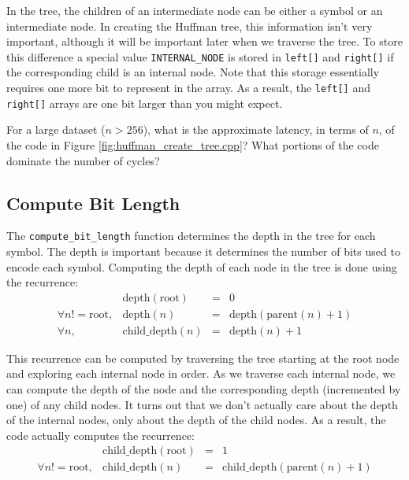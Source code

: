 In the tree, the children of an intermediate node can be either a symbol or an intermediate node.  In creating the Huffman tree, this information isn't very important, although it will be important later when we traverse the tree.  To store this difference
a special value \lstinline{INTERNAL_NODE} is stored in \lstinline{left[]} and \lstinline{right[]} if the corresponding child is an internal node.   Note that this storage essentially requires one more bit to represent in the array.  As a result, the \lstinline{left[]} and \lstinline{right[]} arrays are one bit larger than you might expect. 



\begin{exercise}
For a large dataset ($n > 256$), what is the approximate latency, in terms of $n$, of the code in Figure \ref{fig:huffman_create_tree.cpp}?  What portions of the code dominate the number of cycles?
\end{exercise}

\subsection{Compute Bit Length}

The \lstinline{compute_bit_length} function determines the depth in the tree for each symbol.  The depth is important because it determines the number of bits used to encode each symbol. Computing the depth of each node in the tree is done using the recurrence:
\begin{equation}
\begin{array}{rrcl}
&\mathrm{depth}(\mathrm{root}) &=& 0 \\
\forall n != \mathrm{root}, &\mathrm{depth}(n) &=& \mathrm{depth}(\mathrm{parent}(n)+1)\\
\forall n, &\mathrm{child\_depth}(n) &=& \mathrm{depth}(n)+1
\end{array}
\end{equation}

This recurrence can be computed by traversing the tree starting at the root node and exploring each internal node in order.  As we traverse each internal node, we can compute the depth of the node and the corresponding depth (incremented by one) of any child nodes.  It turns out that we don't actually care about the depth of the internal nodes, only about the depth of the child nodes.  As a result, the code actually computes the recurrence:
\begin{equation}
\begin{array}{rrcl}
&\mathrm{child\_depth}(\mathrm{root}) &=& 1 \\
\forall n != \mathrm{root}, &\mathrm{child\_depth}(n) &=& \mathrm{child\_depth}(\mathrm{parent}(n)+1)
\end{array}
\end{equation}

